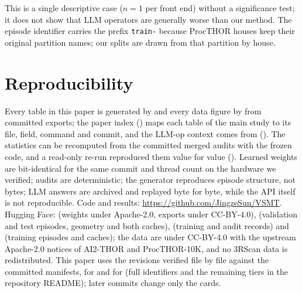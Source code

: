 \begin{table}[t]
\centering
\caption{The LLM-op validation episode: LLM-op and every other arm with its frozen configuration. Cells: value on this episode (validation mean $\pm$ SD over the 43 validation episodes where the metric is defined; percentile of this episode). n/d: undefined on this episode for at least one seed; --: the arm never retracts. Descriptive, $n=1$ per front end.}
\label{tab:llm_op}
\scriptsize
\setlength{\tabcolsep}{4pt}

\end{table}
This is a single descriptive case ($n=1$ per front end) without a significance test; it does not show that LLM operators are generally worse than our method.
The episode identifier carries the prefix \texttt{train-} because ProcTHOR houses keep their original partition names; our splits are drawn from that partition by house.

\section{Reproducibility}
\label{app:repro}
Every table in this paper is generated by  and every data figure by  from committed exports; the paper index () maps each table of the main study to its file, field, command and commit, and the LLM-op context comes from  ().
The statistics can be recomputed from the committed merged audits with the frozen code, and a read-only re-run reproduced them value for value ().
Learned weights are bit-identical for the same commit and thread count on the hardware we verified; audits are deterministic; the generator reproduces episode structure, not bytes; LLM answers are archived and replayed byte for byte, while the API itself is not reproducible.
Code and results: \url{https://github.com/JingzeSun/VSMT}. Hugging Face:  (weights under Apache-2.0, exports under CC-BY-4.0),  (validation and test episodes, geometry and both caches),  (training and audit records) and  (training episodes and caches); the data are under CC-BY-4.0 with the upstream Apache-2.0 notices of AI2-THOR and ProcTHOR-10K, and no 3RScan data is redistributed. This paper uses the revisions verified file by file against the committed manifests,  for  and  for  (full identifiers and the remaining tiers in the repository README); later commits change only the cards.
